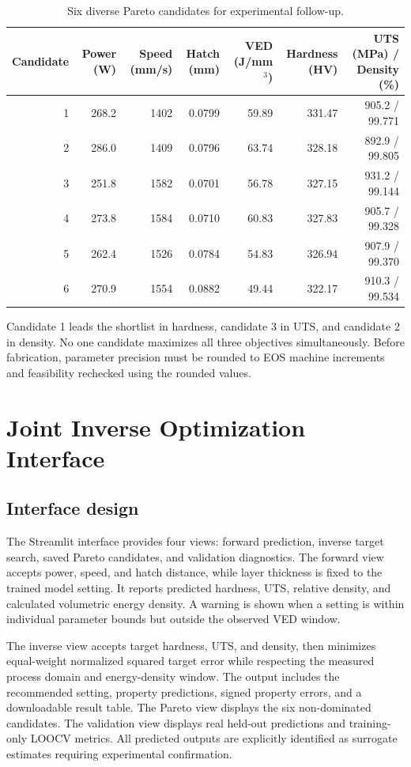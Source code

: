 \documentclass[12pt,a4paper,oneside]{report}
\begin{document}
\begin{table}[H]
\centering
\caption{Six diverse Pareto candidates for experimental follow-up.}
\label{tab:pareto}
\small
\begin{tabular}{rrrrrrr}
\toprule
Candidate & Power (W) & Speed (mm/s) & Hatch (mm) & VED (J/mm$^3$) & Hardness (HV) & UTS (MPa) / Density (\%)\\
\midrule
1 & 268.2 & 1402 & 0.0799 & 59.89 & 331.47 & 905.2 / 99.771\\
2 & 286.0 & 1409 & 0.0796 & 63.74 & 328.18 & 892.9 / 99.805\\
3 & 251.8 & 1582 & 0.0701 & 56.78 & 327.15 & 931.2 / 99.144\\
4 & 273.8 & 1584 & 0.0710 & 60.83 & 327.83 & 905.7 / 99.328\\
5 & 262.4 & 1526 & 0.0784 & 54.83 & 326.94 & 907.9 / 99.370\\
6 & 270.9 & 1554 & 0.0882 & 49.44 & 322.17 & 910.3 / 99.534\\
\bottomrule
\end{tabular}
\end{table}

Candidate 1 leads the shortlist in hardness, candidate 3 in UTS, and candidate 2 in density. No one candidate maximizes all three objectives simultaneously. Before fabrication, parameter precision must be rounded to EOS machine increments and feasibility rechecked using the rounded values.

\chapter{Joint Inverse Optimization Interface}

\section{Interface design}
The Streamlit interface provides four views: forward prediction, inverse target search, saved Pareto candidates, and validation diagnostics. The forward view accepts power, speed, and hatch distance, while layer thickness is fixed to the trained model setting. It reports predicted hardness, UTS, relative density, and calculated volumetric energy density. A warning is shown when a setting is within individual parameter bounds but outside the observed VED window.

The inverse view accepts target hardness, UTS, and density, then minimizes equal-weight normalized squared target error while respecting the measured process domain and energy-density window. The output includes the recommended setting, property predictions, signed property errors, and a downloadable result table. The Pareto view displays the six non-dominated candidates. The validation view displays real held-out predictions and training-only LOOCV metrics. All predicted outputs are explicitly identified as surrogate estimates requiring experimental confirmation.
\end{document}
